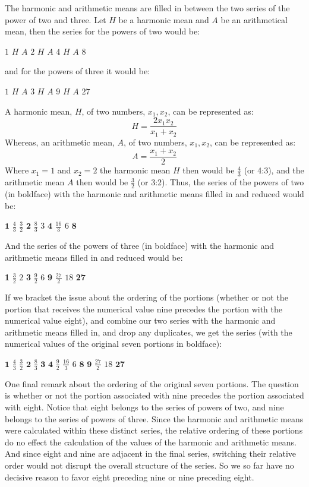 The harmonic and arithmetic means are filled in between the two series of the power of two and three. Let \( H \) be a harmonic mean and \( A \) be an arithmetical mean, then the series for the powers of two would be:
\begin{center}
	\( 1 \) \( H \) \( A \) \( 2 \) \( H \) \( A \) \( 4 \) \( H \) \( A \) \( 8 \) 
\end{center}
and for the powers of three it would be:
\begin{center}
	\( 1 \) \( H \) \( A \) \( 3 \) \( H \) \( A \) \( 9 \) \( H \) \( A \) \( 27 \)
\end{center}
A harmonic mean, \( H \), of two numbers, \( x_{1}, x_{2} \), can be represented as:
\[ H = \frac{2x_{1}x_{2}}{x_{1} + x_{2}} \]
Whereas, an arithmetic mean, \( A \), of two numbers, \( x_{1}, x_{2} \), can be represented as:
\[ A = \frac{x_{1} + x_{2}}{2} \]
Where \( x_{1} = 1 \) and \( x_{2} = 2 \) the harmonic mean \( H \) then would be \( \frac{4}{3} \) (or 4:3), and the arithmetic mean \( A \) then would be \( \frac{3}{2} \) (or 3:2). Thus, the series of the powers of two (in boldface) with the harmonic and arithmetic means filled in and reduced would be:
\begin{center}
	\( \mathbf{1} \) \( \frac{4}{3} \) \( \frac{3}{2} \) \( \mathbf{2} \) \( \frac{8}{3} \) \( 3 \) \( \mathbf{4} \) \( \frac{16}{3} \) \( 6 \) \( \mathbf{8} \)
\end{center}
And the series of the powers of three (in boldface) with the harmonic and arithmetic means filled in and reduced would be:
\begin{center}
	\textbf{1} \( \frac{3}{2} \) \( 2 \) \textbf{3} \( \frac{9}{2} \) \( 6 \) \textbf{9} \( \frac{27}{2} \) \( 18 \) \textbf{27}
\end{center}
If we bracket the issue about the ordering of the portions (whether or not the portion that receives the numerical value nine precedes the portion with the numerical value eight), and combine our two series with the harmonic and arithmetic means filled in, and drop any duplicates, we get the series (with the numerical values of the original seven portions in boldface):
\begin{center}
	\( \mathbf{1} \) \( \frac{4}{3} \) \( \frac{3}{2} \) \( \mathbf{2} \) \( \frac{8}{3} \) \( \mathbf{3} \) \( \mathbf{4} \) \( \frac{9}{2} \) \( \frac{16}{3} \) \( 6 \) \( \mathbf{8} \) \( \mathbf{9} \) \( \frac{27}{2} \) \( 18 \) \( \mathbf{27} \)
\end{center}

One final remark about the ordering of the original seven portions. The question is whether or not the portion associated with nine precedes the portion associated with eight. Notice that eight belongs to the series of powers of two, and nine belongs to the series of powers of three. Since the harmonic and arithmetic means were calculated within these distinct series, the relative ordering of these portions do no effect the calculation of the values of the harmonic and arithmetic means. And since eight and nine are adjacent in the final series, switching their relative order would not disrupt the overall structure of the series. So we so far have no decisive reason to favor eight preceding nine or nine preceding eight.

